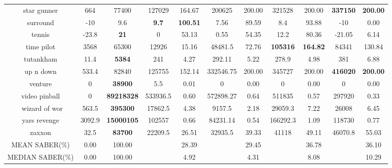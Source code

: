 \begin{center}
\begin{tabular}{ccccccccccc}
 star gunner        & 664       & 77400              & 127029   &164.67  & 200625     & 200.00     & 321528  & 200.00                               &\textbf{337150}            &\textbf{200.00}   \\
 surround           & -10       & 9.6                & \textbf{9.7}      &\textbf{100.51}  & 7.56       & 89.59      & 8.4     & 93.88              & -10              & 0.00 \\
 tennis             & -23.8     & \textbf{21}                 & 0        &53.13   & 0.55       & 54.35      & 12.2    & 80.36                                & -21.05              & 6.14 \\
 time pilot         & 3568      & 65300              & 12926    &15.16   & 48481.5    & 72.76      & \textbf{105316}  & \textbf{164.82}                               & 84341            & 130.84   \\
 tutankham          & 11.4      & \textbf{5384}      & 241      &4.27    & 292.11     & 5.22       & 278.9   & 4.98                                 & 381             & 6.88          \\
 up n down          & 533.4     & 82840              & 125755   &152.14  & 332546.75  & 200.00     & 345727  & 200.00                               &\textbf{416020}            &\textbf{200.00} \\
 venture            & 0         & \textbf{38900}     & 5.5      &0.01    & 0          & 0.00       & 0       & 0.00                                 & 0             & 0.00                 \\
 video pinball      & 0         & \textbf{89218328}  & 533936.5 &0.60    & 572898.27  & 0.64       & 511835  & 0.57                                 & 297920           & 0.33                  \\\
 wizard of wor      & 563.5     & \textbf{395300}    & 17862.5  &4.38    & 9157.5     & 2.18       & 29059.3 & 7.22                                 & 26008            & 6.45                \\
 yars revenge       & 3092.9    & \textbf{15000105}  & 102557   &0.66    & 84231.14   & 0.54       & 166292.3& 1.09                                 & 118730           & 0.77              \\
 zaxxon             & 32.5      & \textbf{83700}              & 22209.5  &26.51   & 32935.5    & 39.33      & 41118   & 49.11                                & 46070.8            & 55.03  \\
\hline
MEAN SABER(\%) &     0.00 & 100.00   &         & 28.39 &         & 29.45  &        & 36.78 &      &36.10\\
\hline
MEDIAN SABER(\%) & 0.00   & 100.00   &         & 4.92 &         & 4.31  &        & 8.08  &      &10.29  \\
\bottomrule
\end{tabular}
\end{center}
\clearpage

